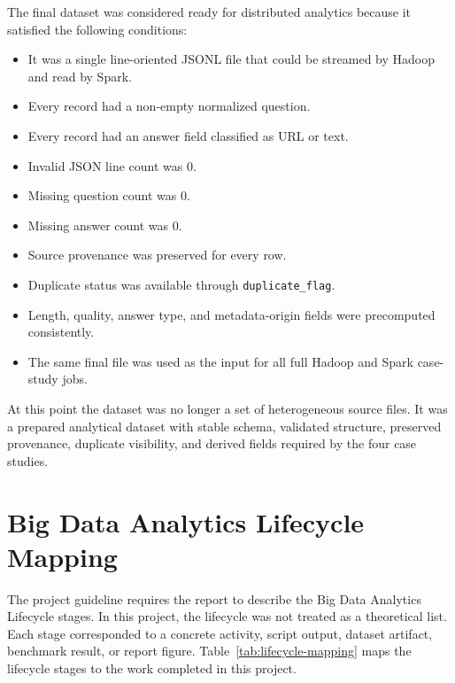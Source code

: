 \documentclass[12pt,a4paper]{article}
\let\oldsection\section
\renewcommand{\section}{\clearpage\oldsection}
\begin{document}
The final dataset was considered ready for distributed analytics because it satisfied the following conditions:

\begin{itemize}
\item It was a single line-oriented JSONL file that could be streamed by Hadoop and read by Spark.
\item Every record had a non-empty normalized question.
\item Every record had an answer field classified as URL or text.
\item Invalid JSON line count was 0.
\item Missing question count was 0.
\item Missing answer count was 0.
\item Source provenance was preserved for every row.
\item Duplicate status was available through \texttt{duplicate\_flag}.
\item Length, quality, answer type, and metadata-origin fields were precomputed consistently.
\item The same final file was used as the input for all full Hadoop and Spark case-study jobs.
\end{itemize}

At this point the dataset was no longer a set of heterogeneous source files. It was a prepared analytical dataset with stable schema, validated structure, preserved provenance, duplicate visibility, and derived fields required by the four case studies.

\section{Big Data Analytics Lifecycle Mapping}

The project guideline requires the report to describe the Big Data Analytics Lifecycle stages. In this project, the lifecycle was not treated as a theoretical list. Each stage corresponded to a concrete activity, script output, dataset artifact, benchmark result, or report figure. Table~\ref{tab:lifecycle-mapping} maps the lifecycle stages to the work completed in this project.
\end{document}
